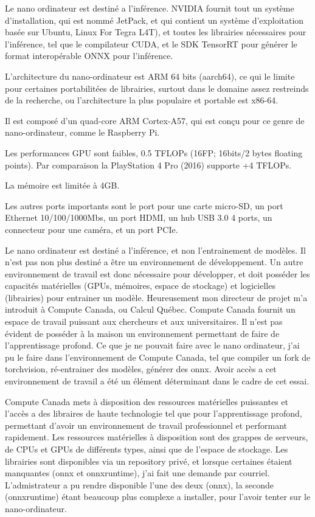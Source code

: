 \par Le nano ordinateur est destiné a l'inférence. NVIDIA fournit tout un système d'installation, qui est nommé JetPack, et qui contient un système d'exploitation basée sur Ubuntu, Linux For Tegra L4T), et toutes les librairies nécessaires pour l'inférence, tel que le compilateur CUDA, et le SDK TensorRT pour générer le format interopérable ONNX pour l'inférence.
\par L'architecture du nano-ordinateur est ARM 64 bits (aarch64), ce qui le limite pour certaines portabilitées de librairies, surtout dans le domaine assez restreinds de la recherche, ou l'architecture la plus populaire et portable est x86-64. 
\par Il est composé d'un quad-core ARM Cortex-A57, qui est conçu pour ce genre de nano-ordinateur, comme le Raspberry Pi.
\par Les performances GPU sont faibles, 0.5 TFLOPs (16FP; 16bits/2 bytes floating points). Par comparaison la PlayStation 4 Pro (2016) supporte +4 TFLOPs. 
\par La mémoire est limitée à 4GB. 
\par Les autres ports importants sont le port pour une carte micro-SD, un port Ethernet 10/100/1000Mbs, un port HDMI, un hub USB 3.0 4 ports, un connecteur pour une caméra, et un port PCIe.
\par Le nano ordinateur est destiné a l'inférence, et non l'entrainement de modèles. Il n'est pas non plus destiné a être un environnement de développement. Un autre environnement de travail est donc nécessaire pour développer, et doit posséder les capacités matérielles (GPUs, mémoires, espace de stockage) et logicielles (librairies) pour entrainer un modèle. Heureusement mon directeur de projet m'a introduit à Compute Canada, ou Calcul Québec. Compute Canada fournit un espace de travail puissant aux chercheurs et aux universitaires. Il n'est pas évident de posséder à la maison un environnement permettant de faire de l'apprentissage profond. Ce que je ne pouvait faire avec le nano ordinateur, j'ai pu le faire dans l'environnement de Compute Canada, tel que compiler un fork de torchvision, ré-entrainer des modèles, générer des onnx. Avoir accès a cet environnement de travail a été un élément déterminant dans le cadre de cet essai.
\par Compute Canada mets à disposition des ressources matérielles puissantes et l'accès a des libraires de haute technologie tel que pour l'apprentissage profond, permettant d'avoir un environnement de travail professionnel et performant rapidement. Les ressources matérielles à disposition sont des grappes de serveurs, de CPUs et GPUs de différents types, ainsi que de l'espace de stockage. Les librairies sont disponibles via un repository privé, et lorsque certaines étaient manquantes (onnx et onnxruntime), j'ai fait une demande par courriel. L'admistrateur a pu rendre disponible l'une des deux (onnx), la seconde (onnxruntime) étant beaucoup plus complexe a installer, pour l'avoir tenter sur le nano-ordinateur. 
